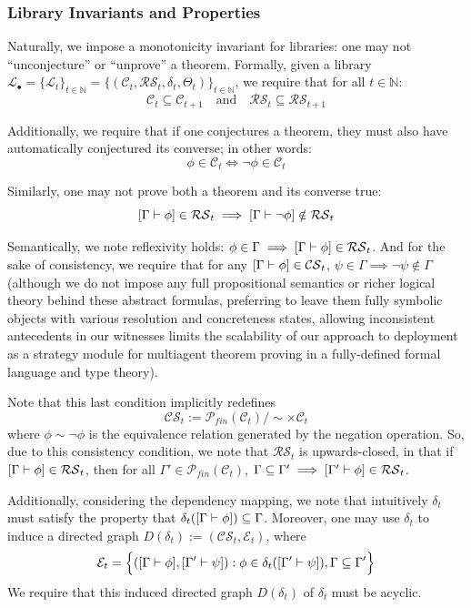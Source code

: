 \subsubsection{Library Invariants and Properties}

Naturally, we impose a monotonicity invariant for libraries: one may not ``unconjecture'' or ``unprove'' a theorem. Formally, given a library $\mathcal{L}_\bullet = \{\mathcal{L}_t\}_{t \in \mathbb{N}}=\{(\mathcal{C}_t,\mathcal{RS}_t,\delta_t,\Theta_t)\}_{t \in \mathbb{N}}$, we require that for all $t \in \mathbb{N}$:
\[\mathcal{C}_{t} \subseteq \mathcal{C}_{t+1} \quad \text{and} \quad \mathcal{RS}_{t} \subseteq \mathcal{RS}_{t+1}\]

Additionally, we require that if one conjectures a theorem, they must also have automatically conjectured its converse; in other words:
\[\phi \in \mathcal{C}_t \iff \neg\phi \in \mathcal{C}_t\]

Similarly, one may not prove both a theorem and its converse true: 
\[[\Gamma \vdash \phi] \in \mathcal{RS}_t \implies [\Gamma \vdash \neg \phi] \notin \mathcal{RS}_t\]

Semantically, we note reflexivity holds: $\phi \in \Gamma \implies [\Gamma \vdash \phi] \in \mathcal{RS}_t$. And for the sake of consistency, we require that for any $[\Gamma \vdash \phi] \in \mathcal{CS}_t$, $\psi \in \Gamma \implies \neg\psi \notin \Gamma$ (although we do not impose any full propositional semantics or richer logical theory behind these abstract formulas, preferring to leave them fully symbolic objects with various resolution and concreteness states, allowing inconsistent antecedents in our witnesses limits the scalability of our approach to deployment as a strategy module for multiagent theorem proving in a fully-defined formal language and type theory). 

Note that this last condition implicitly redefines
\[\mathcal{CS}_t := \mathcal{P}_{fin}(\mathcal{C}_t)/\sim \times \mathcal{C}_t \] where $\phi\sim\neg\phi$ is the equivalence relation generated by the negation operation. So, due to this consistency condition, we note that $\mathcal{RS}_t$ is upwards-closed, in that if $[\Gamma \vdash \phi] \in \mathcal{RS}_t$, then for all $\Gamma' \in \mathcal{P}_{fin}(\mathcal{C}_t)$, $\Gamma \subseteq \Gamma' \implies [\Gamma'\vdash\phi]\in \mathcal{RS}_t$.

Additionally, considering the dependency mapping, we note that intuitively $\delta_t$ must satisfy the property that $\delta_t([\Gamma \vdash \phi]) \subseteq \Gamma$. Moreover, one may use $\delta_t$ to induce a directed graph $D(\delta_t) := (\mathcal{CS}_t,\mathcal{E}_t)$, where 
\[\mathcal{E}_t = \Big\{([\Gamma\vdash \phi], [\Gamma' \vdash \psi]) : \phi \in \delta_t([\Gamma' \vdash \psi]), \Gamma\subseteq \Gamma'\Big\}\]
We require that this induced directed graph $D(\delta_t)$ of $\delta_t$ must be acyclic.

